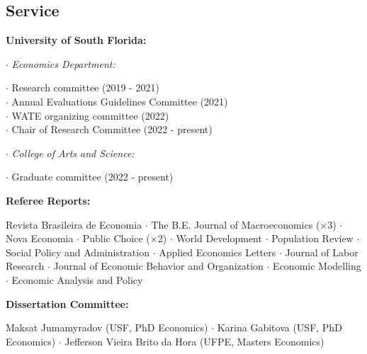 \documentclass[mm, 10pt]{simple_style}
\begin{document}
\begin{resume}


\section{Service}

\textbf{University of South Florida:} 

$\cdot$ \indent \textit{Economics Department:} \\
\indent \hspace{1cm}  \begin{minipage}[t]{0.75\textwidth}
        $\cdot$ Research committee (2019 - 2021) \\
        $\cdot$ Annual Evaluations Guidelines Committee (2021) \\
        $\cdot$ WATE organizing committee (2022) \\
        $\cdot$ Chair of Research Committee (2022 - present)
        \end{minipage}

$\cdot$ \indent \textit{College of Arts and Science:} \\
\indent \hspace{1cm}  \begin{minipage}[t]{0.75\textwidth}
        $\cdot$ Graduate committee (2022 - present)  \\
        \end{minipage}


\textbf{Referee Reports:} \\
\indent \hspace{1cm}  \begin{minipage}[t]{0.75\textwidth}
Revista Brasileira de Economia 
$\cdot$ The B.E. Journal of Macroeconomics ($\times$3) 
$\cdot$ Nova Economia 
$\cdot$ Public Choice ($\times$2) 
$\cdot$ World Development 
$\cdot$ Population Review 
$\cdot$ Social Policy and Administration 
$\cdot$ Applied Economics Letters 
$\cdot$ Journal of Labor Research
$\cdot$ Journal of Economic Behavior and Organization
$\cdot$ Economic Modelling
$\cdot$ Economic Analysis and Policy
\end{minipage}

\textbf{Dissertation Committee:} \\
\indent \hspace{1cm}  \begin{minipage}[t]{0.75\textwidth}
        Maksat Jumamyradov (USF, PhD Economics)
        $\cdot$ Karina Gabitova (USF, PhD Economics)
        $\cdot$ Jefferson Vieira Brito da Hora (UFPE, Masters Economics)
        \end{minipage}        


\end{resume}
\end{document}
